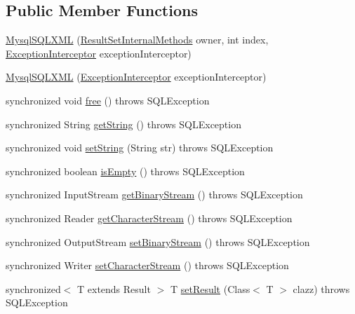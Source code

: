 \subsection*{Public Member Functions}
\begin{DoxyCompactItemize}
\item 
\mbox{\hyperlink{classcom_1_1mysql_1_1cj_1_1jdbc_1_1_mysql_s_q_l_x_m_l_a47f9e3571a47550066900bbd85857a6a}{Mysql\+S\+Q\+L\+X\+ML}} (\mbox{\hyperlink{interfacecom_1_1mysql_1_1cj_1_1jdbc_1_1result_1_1_result_set_internal_methods}{Result\+Set\+Internal\+Methods}} owner, int index, \mbox{\hyperlink{interfacecom_1_1mysql_1_1cj_1_1exceptions_1_1_exception_interceptor}{Exception\+Interceptor}} exception\+Interceptor)
\item 
\mbox{\hyperlink{classcom_1_1mysql_1_1cj_1_1jdbc_1_1_mysql_s_q_l_x_m_l_acbcbd21c888cad7b260733a1afb80880}{Mysql\+S\+Q\+L\+X\+ML}} (\mbox{\hyperlink{interfacecom_1_1mysql_1_1cj_1_1exceptions_1_1_exception_interceptor}{Exception\+Interceptor}} exception\+Interceptor)
\item 
synchronized void \mbox{\hyperlink{classcom_1_1mysql_1_1cj_1_1jdbc_1_1_mysql_s_q_l_x_m_l_a45cf79026854c00d4532b52c4c7a1431}{free}} ()  throws S\+Q\+L\+Exception 
\item 
synchronized String \mbox{\hyperlink{classcom_1_1mysql_1_1cj_1_1jdbc_1_1_mysql_s_q_l_x_m_l_aabe47e5cee6d5aa42529e32f0a1ac45d}{get\+String}} ()  throws S\+Q\+L\+Exception 
\item 
synchronized void \mbox{\hyperlink{classcom_1_1mysql_1_1cj_1_1jdbc_1_1_mysql_s_q_l_x_m_l_a76ebfa8a2a09d7444e1ed47b85fb74b5}{set\+String}} (String str)  throws S\+Q\+L\+Exception 
\item 
synchronized boolean \mbox{\hyperlink{classcom_1_1mysql_1_1cj_1_1jdbc_1_1_mysql_s_q_l_x_m_l_a2af777f2c823e73aa383dbd2bbfbe596}{is\+Empty}} ()  throws S\+Q\+L\+Exception 
\item 
synchronized Input\+Stream \mbox{\hyperlink{classcom_1_1mysql_1_1cj_1_1jdbc_1_1_mysql_s_q_l_x_m_l_ade81fe7aaf81880f4c8afe0959dd56c4}{get\+Binary\+Stream}} ()  throws S\+Q\+L\+Exception 
\item 
synchronized Reader \mbox{\hyperlink{classcom_1_1mysql_1_1cj_1_1jdbc_1_1_mysql_s_q_l_x_m_l_a52f8afb7b30fe00098127bb05b130652}{get\+Character\+Stream}} ()  throws S\+Q\+L\+Exception 
\item 
synchronized Output\+Stream \mbox{\hyperlink{classcom_1_1mysql_1_1cj_1_1jdbc_1_1_mysql_s_q_l_x_m_l_ad6b44dc062b3ad75cfc723dee3a03b21}{set\+Binary\+Stream}} ()  throws S\+Q\+L\+Exception 
\item 
synchronized Writer \mbox{\hyperlink{classcom_1_1mysql_1_1cj_1_1jdbc_1_1_mysql_s_q_l_x_m_l_ae84885df28f44ed061ec12063718d8c2}{set\+Character\+Stream}} ()  throws S\+Q\+L\+Exception 
\item 
synchronized$<$ T extends Result $>$ T \mbox{\hyperlink{classcom_1_1mysql_1_1cj_1_1jdbc_1_1_mysql_s_q_l_x_m_l_a099fb4f81f28300defc9672636b04b18}{set\+Result}} (Class$<$ T $>$ clazz)  throws S\+Q\+L\+Exception 
\end{DoxyCompactItemize}

